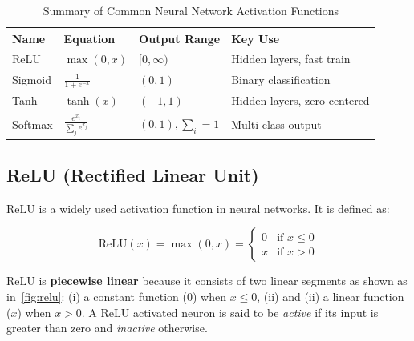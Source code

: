 \documentclass[oneside,11pt,dvipsnames]{book}
\numberwithin{equation}{section}
\theoremstyle{definition}
\theoremstyle{remark}
\newcommand{\relu}[1]{\mathrm{ReLU}\left(#1\right)}
\newcommand{\sigmoid}[1]{\mathrm{sigmoid}\left(#1\right)}
\begin{document}
\begin{table}
  \centering
  \caption{Summary of Common Neural Network Activation Functions}\label{tab:activation}
  \small
  \begin{tabular}{llll}
    \toprule
    \textbf{Name} & \textbf{Equation} & \textbf{Output Range} & \textbf{Key Use} \\
    \midrule
    ReLU      & $ \max(0, x) $                   & $[0, \infty)$   & Hidden layers, fast train \\
    Sigmoid   & $ \frac{1}{1 + e^{-x}} $         & $(0, 1)$        & Binary classification \\
    Tanh      & $ \tanh(x) $                     & $(-1, 1)$       & Hidden layers, zero-centered \\
    Softmax   & $ \frac{e^{x_i}}{\sum_j e^{x_j}} $& $(0, 1), \sum_i=1 $ & Multi-class output \\
    \bottomrule
  \end{tabular}
\end{table}


\subsection{ReLU (Rectified Linear Unit)}\label{sec:relu}

ReLU is a widely used activation function in neural networks. It is defined as:

\[
\relu{x} = \max(0, x) =
\begin{cases}
0 & \text{if } x \leq 0 \\
x & \text{if } x > 0
\end{cases}
\]

ReLU is \textbf{piecewise linear} because it consists of two linear segments as shown as in~\autoref{fig:relu}: (i) a constant function ($0$) when $x \leq 0$, (ii) and (ii) a linear function ($x$) when $x > 0$.
A ReLU activated neuron is said to be \emph{active} if its input is greater than zero and \emph{inactive} otherwise.
\end{document}
